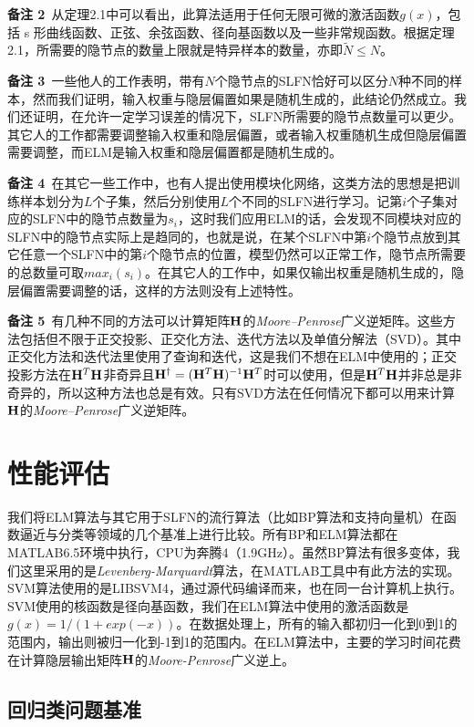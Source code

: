 \documentclass[conference]{IEEEtran}
\begin{document}
\textbf{备注 2}\ 从定理2.1中可以看出，此算法适用于任何无限可微的激活函数$g(x)$，包括 s 形曲线函数、正弦、余弦函数、径向基函数以及一些非常规函数。根据定理2.1，所需要的隐节点的数量上限就是特异样本的数量，亦即$\tilde N \le N$。

\textbf{备注 3}\ 一些他人的工作表明，带有$N$个隐节点的SLFN恰好可以区分$N$种不同的样本，然而我们证明，输入权重与隐层偏置如果是随机生成的，此结论仍然成立。我们还证明，在允许一定学习误差的情况下，SLFN所需要的隐节点数量可以更少。其它人的工作都需要调整输入权重和隐层偏置，或者输入权重随机生成但隐层偏置需要调整，而ELM是输入权重和隐层偏置都是随机生成的。

\textbf{备注 4}\ 在其它一些工作中，也有人提出使用模块化网络，这类方法的思想是把训练样本划分为$L$个子集，然后分别使用$L$个不同的SLFN进行学习。记第$i$个子集对应的SLFN中的隐节点数量为$s_i$，这时我们应用ELM的话，会发现不同模块对应的SLFN中的隐节点实际上是趋同的，也就是说，在某个SLFN中第$i$个隐节点放到其它任意一个SLFN中的第$i$个隐节点的位置，模型仍然可以正常工作，隐节点所需要的总数量可取$max_i(s_i)$。在其它人的工作中，如果仅输出权重是随机生成的，隐层偏置需要调整的话，这样的方法则没有上述特性。

\textbf{备注 5}\ 有几种不同的方法可以计算矩阵${\bf H}$的\textit{Moore–Penrose}广义逆矩阵。这些方法包括但不限于正交投影、正交化方法、迭代方法以及单值分解法（SVD）。其中正交化方法和迭代法里使用了查询和迭代，这是我们不想在ELM中使用的；正交投影方法在${\bf H}^T{\bf H}$非奇异且${\bf H}^{\dagger}=({\bf H}^T{\bf H})^{-1}{\bf H}^T$时可以使用，但是${\bf H}^T{\bf H}$并非总是非奇异的，所以这种方法也总是有效。只有SVD方法在任何情况下都可以用来计算${\bf H}$的\textit{Moore–Penrose}广义逆矩阵。

\section{性能评估}

我们将ELM算法与其它用于SLFN的流行算法（比如BP算法和支持向量机）在函数逼近与分类等领域的几个基准上进行比较。所有BP和ELM算法都在MATLAB6.5环境中执行，CPU为奔腾4（1.9GHz）。虽然BP算法有很多变体，我们这里采用的是\textit{Levenberg-Marquardt}算法，在MATLAB工具中有此方法的实现。SVM算法使用的是LIBSVM4，通过源代码编译而来，也在同一台计算机上执行。SVM使用的核函数是径向基函数，我们在ELM算法中使用的激活函数是$g(x)=1/(1+exp(-x))$。在数据处理上，所有的输入都初归一化到0到1的范围内，输出则被归一化到-1到1的范围内。在ELM算法中，主要的学习时间花费在计算隐层输出矩阵${\bf H}$的\textit{Moore-Penrose}广义逆上。

\subsection{回归类问题基准}
\end{document}
